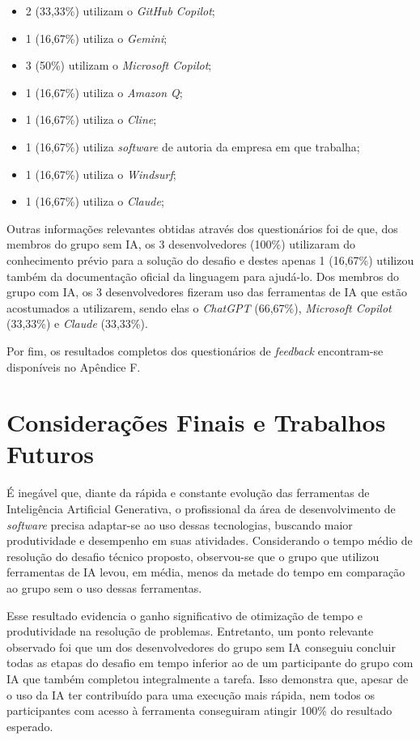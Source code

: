 \documentclass[english,brazilian]{UNISINOSartigo} %
\begin{document}
\begin{itemize}[leftmargin=1cm, itemsep=0.1em, topsep=0.1em]
\begin{itemize}[leftmargin=1.2cm, itemsep=0.1em, topsep=0.1em]
        \item 2 (33,33\%) utilizam o \textit{GitHub Copilot};
        \item 1 (16,67\%) utiliza o \textit{Gemini};
        \item 3 (50\%) utilizam o \textit{Microsoft Copilot};
        \item 1 (16,67\%) utiliza o \textit{Amazon Q};
        \item 1 (16,67\%) utiliza o \textit{Cline};
        \item 1 (16,67\%) utiliza \textit{software} de autoria da empresa em que trabalha;
        \item 1 (16,67\%) utiliza o \textit{Windsurf};
        \item 1 (16,67\%) utiliza o \textit{Claude};
    \end{itemize}
\end{itemize}

Outras informações relevantes obtidas através dos questionários foi de que, dos membros do grupo sem IA, os 3 desenvolvedores (100\%) utilizaram do conhecimento prévio para a solução do desafio e destes apenas 1 (16,67\%) utilizou também da documentação oficial da linguagem para ajudá-lo. Dos membros do grupo com IA, os 3 desenvolvedores fizeram uso das ferramentas de IA que estão acostumados a utilizarem, sendo elas o \textit{ChatGPT} (66,67\%), \textit{Microsoft Copilot} (33,33\%) e \textit{Claude} (33,33\%).

Por fim, os resultados completos dos questionários de \textit{feedback} encontram-se disponíveis no Apêndice F.

\section{Considerações Finais e Trabalhos Futuros}

É inegável que, diante da rápida e constante evolução das ferramentas de Inteligência Artificial Generativa, o profissional da área de desenvolvimento de \textit{software} precisa adaptar-se ao uso dessas tecnologias, buscando maior produtividade e desempenho em suas atividades. Considerando o tempo médio de resolução do desafio técnico proposto, observou-se que o grupo que utilizou ferramentas de IA levou, em média, menos da metade do tempo em comparação ao grupo sem o uso dessas ferramentas.

Esse resultado evidencia o ganho significativo de otimização de tempo e produtividade na resolução de problemas. Entretanto, um ponto relevante observado foi que um dos desenvolvedores do grupo sem IA conseguiu concluir todas as etapas do desafio em tempo inferior ao de um participante do grupo com IA que também completou integralmente a tarefa. Isso demonstra que, apesar de o uso da IA ter contribuído para uma execução mais rápida, nem todos os participantes com acesso à ferramenta conseguiram atingir 100\% do resultado esperado.
\end{document}
